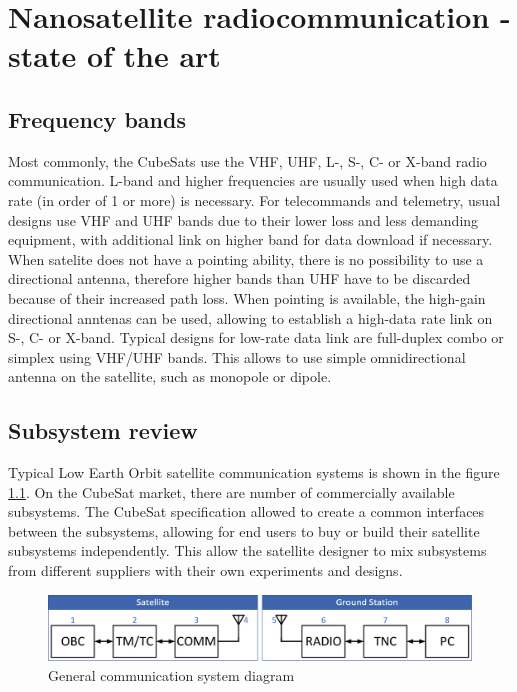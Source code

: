 \chapter{Nanosatellite radiocommunication - state of the art}

\section{Frequency bands}
Most commonly, the CubeSats use the VHF, UHF, L-, S-, C- or X-band radio communication. L-band and higher frequencies are usually used when high data rate (in order of \SI{1}{\Mbps} or more) is necessary. For telecommands and telemetry, usual designs use VHF and UHF bands due to their lower loss and less demanding equipment, with additional link on higher band for data download if necessary. When satelite does not have a pointing ability, there is no possibility to use a directional antenna, therefore higher bands than UHF have to be discarded because of their increased path loss. When pointing is available, the high-gain directional anntenas can be used, allowing to establish a high-data rate link on S-, C- or X-band. Typical designs for low-rate data link are full-duplex combo or simplex using VHF/UHF bands. This allows to use simple omnidirectional antenna on the satellite, such as monopole or dipole.

\section{Subsystem review}
Typical Low Earth Orbit satellite communication systems is shown in the figure \ref{comm_diagram}.
On the CubeSat market, there are number of commercially available subsystems. The CubeSat specification allowed to create a common interfaces between the subsystems, allowing for end users to buy or build their satellite subsystems independently. This allow the satellite designer to mix subsystems from different suppliers with their own experiments and designs.

\begin{figure}[h]
    \centering
    \includegraphics[width=0.7\paperwidth]{img/4/comm_diagram.eps}
    \caption{General communication system diagram}
    \label{comm_diagram}
\end{figure}

